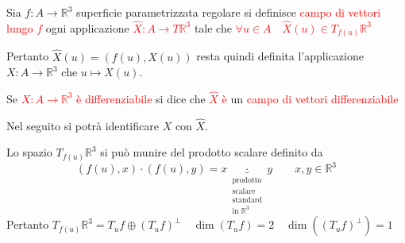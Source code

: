 \begin{osservazione}
\begin{center}
        \end{center}
        \end{osservazione}
        \newpage 
        \begin{definizione}
        Sia $f \colon A \to \mathbb{R}^3$ superficie parametrizzata regolare si definisce \textcolor{red}{campo di vettori lungo $f$} 
        ogni applicazione \textcolor{red}{$\hat{X} \colon A \to T \mathbb{R}^3$} tale che \textcolor{red}{$\forall u \in A \quad \hat{X}(u) \in T_{f(u)} \mathbb{R}^3$}

        Pertanto $\hat{X}(u) = \left(f(u), X(u)\right)$ resta quindi definita l'applicazione $X \colon A \to \mathbb{R}^3$ che $u \mapsto X(u)$.

        Se \textcolor{red}{$X: A \to \mathbb{R}^3$ è differenziabile} si dice che \textcolor{red}{$\hat{X}$ è} un \textcolor{red}{campo di vettori differenziabile}

        Nel seguito si potrà identificare $X$ con $\hat{X}$.
        \end{definizione}
        \begin{osservazione}
        Lo spazio $T_{f(u)} \mathbb{R}^3$ si può munire del prodotto scalare definito da 
        \[ \left(f(u), x\right) \cdot \left(f(u), y\right) = x \underbrace{\cdot}_{\substack{\text{prodotto} \\ \text{scalare} \\ \text{standard} \\ \text{in } \mathbb{R}^3}} y \qquad x,y \in \mathbb{R}^3 \]
        Pertanto $T_{f(u)} \mathbb{R}^3 = T_u f \oplus \left(T_u f\right)^\perp \quad \dim \left(T_uf\right)=2 \quad \dim \left(\left(T_u f\right)^\perp\right)=1$
        \end{osservazione}
